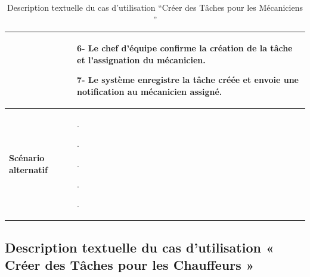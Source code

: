 \begin{table}[H]
  \centering
  \renewcommand{\arraystretch}{1} %
  \begin{tabular}{|p{4cm}|p{9cm}|}


                                 & 6- Le chef d'équipe confirme la création de la tâche et l'assignation du mécanicien.\newline

    7- Le système enregistre la tâche créée et envoie une notification au mécanicien assigné.                                   \\
    \hline
    \textbf{Scénario alternatif} &     .\newline

    .\newline

    .\newline

    .\newline
    
    .\\                                                                                        

    \hline
  \end{tabular}
  \caption{Description textuelle du cas d’utilisation “Créer des Tâches pour les Mécaniciens ”}

\end{table}

\bigskip

\subsection{Description textuelle du cas d’utilisation « Créer des Tâches pour les Chauffeurs »}

